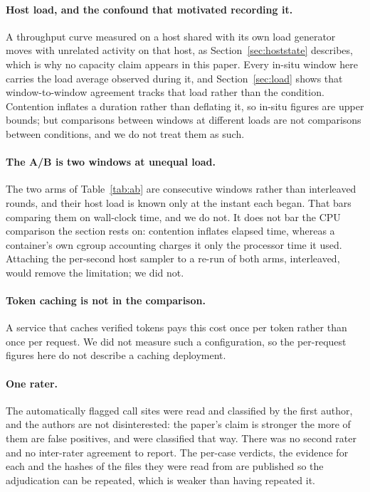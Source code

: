 \documentclass[pdflatex,sn-basic,twocolumn]{sn-jnl}%
\begin{document}
\paragraph{Host load, and the confound that motivated recording it.} A
throughput curve measured on a host shared with its own load generator moves with
unrelated activity on that host, as Section~\ref{sec:hoststate} describes, which
is why no capacity claim appears in this paper. Every in-situ window here carries
the load average observed during it, and Section~\ref{sec:load} shows that window-to-window
agreement tracks that load rather than the condition. Contention inflates a
duration rather than deflating it, so in-situ figures are upper bounds; but
comparisons between windows at different loads are not comparisons between
conditions, and we do not treat them as such.

\paragraph{The A/B is two windows at unequal load.} The two arms of
Table~\ref{tab:ab} are consecutive windows rather than interleaved rounds, and
their host load is known only at the instant each began. That bars comparing
them on wall-clock time, and we do not. It does not bar the CPU comparison the
section rests on: contention inflates elapsed time, whereas a container's own
cgroup accounting charges it only the processor time it used. Attaching the
per-second host sampler to a re-run of both arms, interleaved, would remove the
limitation; we did not.

\paragraph{Token caching is not in the comparison.} A service that caches
verified tokens pays this cost once per token rather than once per request. We
did not measure such a configuration, so the per-request figures here do not
describe a caching deployment.

\paragraph{One rater.} The \AdjudicatedTotal{} automatically flagged call sites
were read and classified by the first author, and the authors are not
disinterested: the paper's claim is stronger the more of them are false
positives, and \AdjudicatedFalsePositive{} were classified that way. There was no
second rater and no inter-rater agreement to report. The per-case verdicts, the
evidence for each and the hashes of the files they were read from are published
so the adjudication can be repeated, which is weaker than having repeated it.
\end{document}
